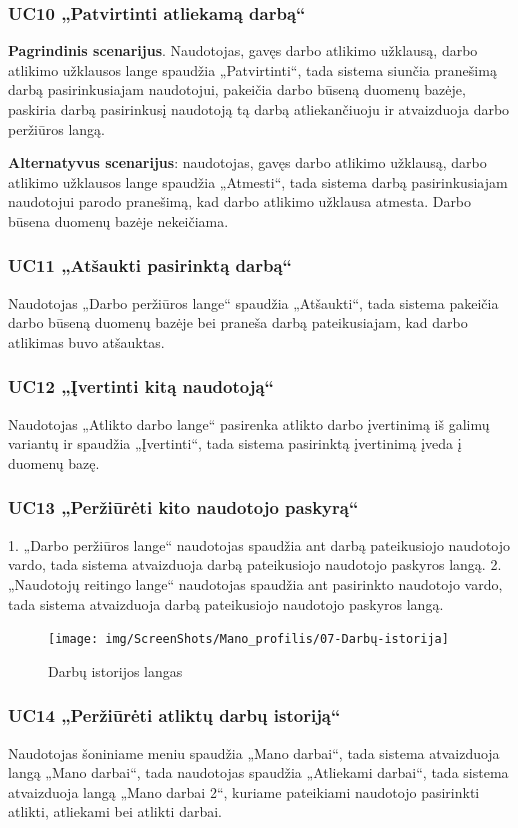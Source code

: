 \documentclass{VUMIFPSbakalaurinis}
\begin{document}
\subsubsection{UC10 „Patvirtinti atliekamą darbą“}
\textbf{Pagrindinis scenarijus}. Naudotojas, gavęs darbo atlikimo užklausą, darbo atlikimo užklausos lange spaudžia „Patvirtinti“, tada sistema siunčia pranešimą darbą pasirinkusiajam naudotojui, pakeičia darbo būseną duomenų bazėje, paskiria darbą pasirinkusį naudotoją tą darbą atliekančiuoju ir atvaizduoja darbo peržiūros langą. 
\par \textbf{Alternatyvus scenarijus}: naudotojas, gavęs darbo atlikimo užklausą, darbo atlikimo užklausos lange spaudžia „Atmesti“, tada sistema darbą pasirinkusiajam naudotojui parodo pranešimą, kad darbo atlikimo užklausa atmesta. Darbo būsena duomenų bazėje nekeičiama.
\subsubsection{UC11 „Atšaukti pasirinktą darbą“}
Naudotojas „Darbo peržiūros lange“ spaudžia „Atšaukti“, tada sistema pakeičia darbo būseną duomenų bazėje bei praneša darbą pateikusiajam, kad darbo atlikimas buvo atšauktas.
\subsubsection{UC12 „Įvertinti kitą naudotoją“}
Naudotojas „Atlikto darbo lange“ pasirenka atlikto darbo įvertinimą iš galimų variantų ir spaudžia „Įvertinti“, tada sistema pasirinktą įvertinimą įveda į duomenų bazę.
\subsubsection{UC13 „Peržiūrėti kito naudotojo paskyrą“}
1. „Darbo peržiūros lange“ naudotojas spaudžia ant darbą pateikusiojo naudotojo vardo, tada sistema atvaizduoja darbą pateikusiojo naudotojo paskyros langą.
2. „Naudotojų reitingo lange“ naudotojas spaudžia ant pasirinkto naudotojo vardo, tada sistema atvaizduoja darbą pateikusiojo naudotojo paskyros langą.

\begin{figure}[H]
	\centering
	\texttt{[image: img/ScreenShots/Mano\_profilis/07-Darbų-istorija]}
	\caption{Darbų istorijos langas}
	\label{img:work history}
\end{figure}
\subsubsection{UC14 „Peržiūrėti atliktų darbų istoriją“}
Naudotojas šoniniame meniu spaudžia „Mano darbai“, tada sistema atvaizduoja langą „Mano darbai“, tada naudotojas spaudžia „Atliekami darbai“, tada sistema atvaizduoja langą „Mano darbai 2“, kuriame pateikiami naudotojo pasirinkti atlikti, atliekami bei atlikti darbai.
\end{document}
